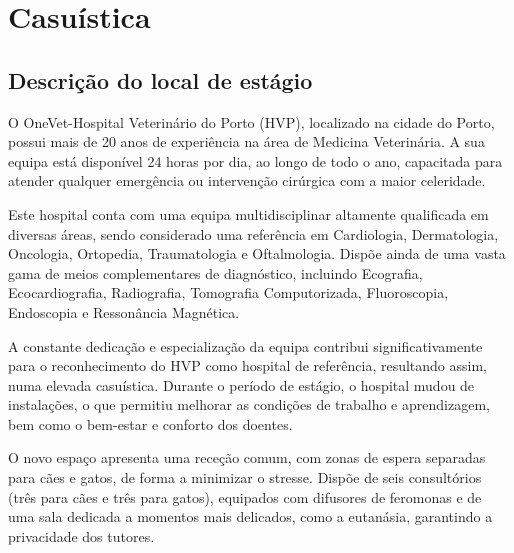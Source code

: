 
\chapter{Casuística}
\label{chapter:Casuistica}



\section{Descrição do local de estágio}


O OneVet-Hospital Veterinário do Porto (HVP), localizado na cidade do Porto, possui mais de 20 anos de experiência na área de Medicina Veterinária. A sua equipa está disponível 24 horas por dia, ao longo de todo o ano, capacitada para atender qualquer emergência ou intervenção cirúrgica com a maior celeridade. 

Este hospital conta com uma equipa multidisciplinar altamente qualificada em diversas áreas, sendo considerado uma referência em Cardiologia, Dermatologia, Oncologia, Ortopedia, Traumatologia e Oftalmologia. Dispõe ainda de uma vasta gama de meios complementares de diagnóstico, incluindo Ecografia, Ecocardiografia, Radiografia, Tomografia Computorizada, Fluoroscopia, Endoscopia e Ressonância Magnética.

A constante dedicação e especialização da equipa contribui significativamente para o reconhecimento do HVP como hospital de referência, resultando assim, numa elevada casuística.
Durante o período de estágio, o hospital mudou de instalações, o que permitiu melhorar as condições de trabalho e aprendizagem, bem como o bem-estar e conforto dos doentes. 

O novo espaço apresenta uma receção comum, com zonas de espera separadas para cães e gatos, de forma a minimizar o stresse. Dispõe de seis consultórios (três para cães e três para gatos), equipados com difusores de feromonas e de uma sala dedicada a momentos mais delicados, como a eutanásia, garantindo a privacidade dos tutores.

